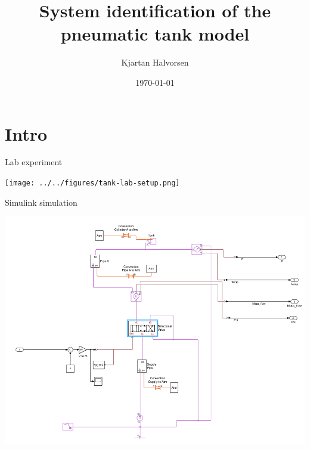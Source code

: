\documentclass[presentation,aspectratio=1610]{beamer}
\author{Kjartan Halvorsen}
\date{\today}
\title{System identification of the pneumatic tank model}
\begin{document}
\maketitle

\section{Intro}
\label{sec:org067222b}
\begin{frame}[label={sec:orge13f9f7}]{Lab experiment}
\begin{center}
\texttt{[image: ../../figures/tank-lab-setup.png]}
\end{center}
\end{frame}

\begin{frame}[label={sec:org9936e26}]{Simulink simulation}
\begin{center}
\includegraphics[width=0.8\linewidth]{../../figures/tank-simscape-model.png}
\end{center}
\end{frame}
\end{document}
